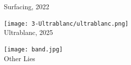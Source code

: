 \begin{titlepage}
\begin{minipage}[t]{0.5\textwidth}
    {\Large \sffamily Surfacing, 2022}
  \end{minipage}
  
  \vspace{2em}
  
  \begin{minipage}[t]{0.5\textwidth}
    \centering
    \texttt{[image: 3-Ultrablanc/ultrablanc.png]}\\
    {\Large \sffamily Ultrablanc, 2025}
  \end{minipage}%
  \begin{minipage}[t]{0.5\textwidth}
    \centering
    \texttt{[image: band.jpg]}\\
    {\LARGE \sffamily Other Lies}
  \end{minipage}%
\end{titlepage}


